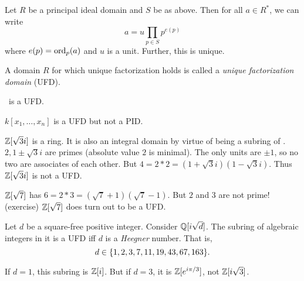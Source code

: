 \begin{theorem}
\label{thm:pid:unique_factorization}
    Let $R$ be a principal ideal domain and $S$ be as above.
    Then for all $a \in R^*$, we can write \[
        a = u \prod_{p \in S} p^{e(p)}
    \] where $e(p) = \operatorname{ord}_p(a)$ and $u$ is a unit.
    Further, this is unique.
\end{theorem}
\begin{definition}
\label{def:pid:unique_factorization:domain}
    A domain $R$ for which unique factorization holds is called a
    \emph{unique factorization domain} (UFD).
\end{definition}
\begin{examples}
    \item \Z\ is a UFD.
    \item $k[x_1, \dots, x_n]$ is a UFD but not a PID.
    \item $\mathbb{Z}[\sqrt 3 i]$ is a ring.
    It is also an integral domain by virtue of being a subring of \C.
    $2, 1 \pm \sqrt 3 i$ are primes (absolute value $2$ is minimal).
    The only units are $\pm 1$, so no two are associates of each other.
    But $4 = 2 * 2 = (1 + \sqrt 3 i)(1 - \sqrt 3 i)$.
    Thus $\mathbb{Z}[\sqrt 3 i]$ is not a UFD.
    \item $\mathbb{Z}[\sqrt 7]$ has $6 = 2 * 3 = (\sqrt 7 + 1)(\sqrt 7 - 1)$.
    But $2$ and $3$ are not prime! (exercise)
    $\mathbb{Z}[\sqrt 7]$ does turn out to be a UFD.
\end{examples}

\begin{fact} \label{thm:pid:unique_factorization:s}
    Let $d$ be a square-free positive integer.
    Consider $\mathbb{Q}[i \sqrt d]$.
    The subring of algebraic integers in it is a UFD iff $d$ is a
    \emph{Heegner} number.
    That is, \[
        d \in \set{1, 2, 3, 7, 11, 19, 43, 67, 163}.
    \]
\end{fact}
If $d = 1$, this subring is $\mathbb{Z}[i]$.
But if $d = 3$, it is $\mathbb{Z}[e^{i \pi/3}]$, not $\mathbb{Z}[i \sqrt 3]$.
